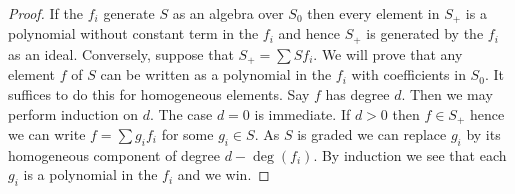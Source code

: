 \documentclass[10pt,a4paper]{amsart}
\theoremstyle{plain}
\theoremstyle{definition}
\theoremstyle{remark}
\numberwithin{equation}{subsection}
\begin{document}
\begin{proof}
If the $f_i$ generate $S$ as an algebra over $S_0$ then every element
in $S_{+}$ is a polynomial without constant term in the $f_i$ and hence
$S_{+}$ is generated by the $f_i$ as an ideal. Conversely, suppose that
$S_{+} = \sum Sf_i$. We will prove that any element $f$ of $S$ can be written
as a polynomial in the $f_i$ with coefficients in $S_0$. It suffices
to do this for homogeneous elements. Say $f$ has degree $d$. Then we may
perform induction on $d$. The case $d = 0$ is immediate. If $d > 0$
then $f \in S_{+}$ hence we can write $f = \sum g_i f_i$
for some $g_i \in S$. As $S$ is graded we can replace $g_i$ by its
homogeneous component of degree $d - \deg(f_i)$. By induction we
see that each $g_i$ is a polynomial in the $f_i$ and we win.
\end{proof}
\end{document}
